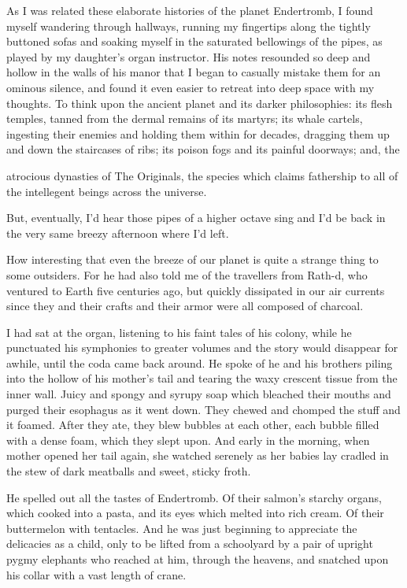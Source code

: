 \documentclass[12pt,twoside]{report}
\begin{document}
{ As I was related these elaborate histories of the planet Endertromb, I
found myself wandering through hallways, running my fingertips along
the tightly buttoned sofas and soaking myself in the saturated
bellowings of the pipes, as played by my daughter's organ instructor.
His notes resounded so deep and hollow in the walls of his manor that
I began to casually mistake them for an ominous silence, and found it
even easier to retreat into deep space with my thoughts.  To think
upon the ancient planet and its darker philosophies: its flesh
temples, tanned from the dermal remains of its martyrs; its whale
cartels, ingesting their enemies and holding them within for decades,
dragging them up and down the staircases of ribs; its poison fogs and
its painful doorways; and, the \unskip\parfillskip 0pt \par}

\pagebreak

atrocious dynasties of The Originals,
the species which claims fathership to all of the intellegent beings
across the universe.

But, eventually, I'd hear those pipes of a higher octave sing and I'd
be back in the very same breezy afternoon where I'd left.

How interesting that even the breeze of our planet is quite a strange
thing to some outsiders.  For he had also told me of the travellers
from Rath-d, who ventured to Earth five centuries ago, but quickly
dissipated in our air currents since they and their crafts and their
armor were all composed of charcoal.

I had sat at the organ, listening to his faint tales of his colony,
while he punctuated his symphonies to greater volumes and the story
would disappear for awhile, until the coda came back around. He spoke
of he and his brothers piling into the hollow of his mother's tail and
tearing the waxy crescent tissue from the inner wall.  Juicy and
spongy and syrupy soap which bleached their mouths and purged their
esophagus as it went down.  They chewed and chomped the stuff and it
foamed.  After they ate, they blew bubbles at each other, each bubble
filled with a dense foam, which they slept upon.  And early in the
morning, when mother opened her tail again, she watched serenely as
her babies lay cradled in the stew of dark meatballs and sweet, sticky
froth.

He spelled out all the tastes of Endertromb.  Of their salmon's
starchy organs, which cooked into a pasta, and its eyes which melted
into rich cream.  Of their buttermelon with tentacles. And he was just
beginning to appreciate the delicacies as a child, only to be lifted
from a schoolyard by a pair of upright pygmy elephants who reached at
him, through the heavens, and snatched upon his collar with a vast
length of crane.
\end{document}
